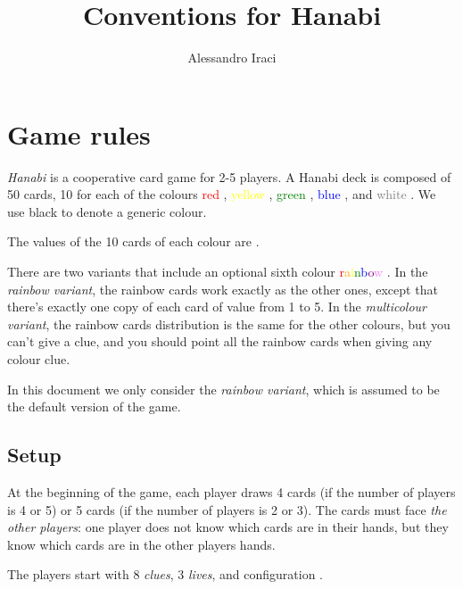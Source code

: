 \documentclass[a4paper]{article}
\title{Conventions for Hanabi}
\author{Alessandro Iraci}
\theoremstyle{plain}
\theoremstyle{definition}
\newtheorem{definition}[theorem]{Definition}
\begin{document}
	
\maketitle

\section{Game rules}

\textit{Hanabi} is a cooperative card game for 2-5 players. A Hanabi deck is composed of 50 cards, 10 for each of the colours \textcolor{red}{red} \red, \textcolor{yellow}{yellow} \yellow, \textcolor{green}{green} \green, \textcolor{blue}{blue} \blue, and \textcolor{gray}{white} \white. We use black to denote a generic colour.

The values of the 10 cards of each colour are          .

There are two variants that include an optional sixth colour \textcolor{red}{r}\textcolor{orange}{a}\textcolor{yellow}{i}\textcolor{green}{n}\textcolor{blue}{b}\textcolor{purple}{o}\textcolor{violet}{w} \rainbow. In the \textit{rainbow variant}, the rainbow cards work exactly as the other ones, except that there's exactly one copy of each card of value from 1 to 5. In the \textit{multicolour variant}, the rainbow cards distribution is the same for the other colours, but you can't give a  clue, and you should point all the rainbow cards when giving any colour clue.

In this document we only consider the \textit{rainbow variant}, which is assumed to be the default version of the game.


\subsection{Setup}

At the beginning of the game, each player draws 4 cards (if the number of players is 4 or 5) or 5 cards (if the number of players is 2 or 3). The cards must face \textit{the other players}: one player does not know which cards are in their hands, but they know which cards are in the other players hands.

The players start with 8 \textit{clues}, 3 \textit{lives}, and configuration      .
\end{document}
